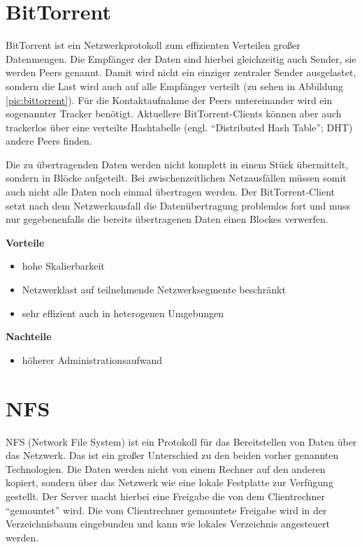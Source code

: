 \section{BitTorrent}
BitTorrent ist ein Netzwerkprotokoll zum effizienten Verteilen großer Datenmengen. Die Empfänger der Daten sind hierbei gleichzeitig auch Sender, sie werden Peers genannt. Damit wird nicht ein einziger zentraler Sender ausgelastet, sondern die Last wird auch auf alle Empfänger verteilt (zu sehen in Abbildung \ref{pic:bittorrent}). Für die Kontaktaufnahme der Peers untereinander wird ein sogenannter Tracker benötigt. Aktuellere BitTorrent-Clients können aber auch trackerlos über eine verteilte Hashtabelle (engl. ``Distributed Hash Table''; DHT) andere Peers finden. 

Die zu übertragenden Daten werden nicht komplett in einem Stück übermittelt, sondern in Blöcke aufgeteilt. Bei zwischenzeitlichen Netzausfällen müssen somit auch nicht alle Daten noch einmal übertragen werden. Der BitTorrent-Client setzt nach dem Netzwerkausfall die Datenübertragung problemlos fort und muss nur gegebenenfalls die bereits übertragenen Daten einen Blockes verwerfen.


\textbf{Vorteile}
\begin{itemize}
 \item hohe Skalierbarkeit
 \item Netzwerklast auf teilnehmende Netzwerksegmente beschränkt
 \item sehr effizient auch in heterogenen Umgebungen
\end{itemize}

\textbf{Nachteile}
\begin{itemize}
  \item höherer Administrationsaufwand
\end{itemize}

\section{NFS}
NFS (Network File System) ist ein Protokoll für das Bereitstellen von Daten über das Netzwerk. Das ist ein großer Unterschied zu den beiden vorher genannten Technologien. Die Daten werden nicht von einem Rechner auf den anderen kopiert, sondern über das Netzwerk wie eine lokale Festplatte zur Verfügung gestellt. Der Server macht hierbei eine Freigabe die von dem Clientrechner ``gemountet'' wird. Die vom Clientrechner gemountete Freigabe wird in der Verzeichnisbaum eingebunden und kann wie lokales Verzeichnis angesteuert werden.

